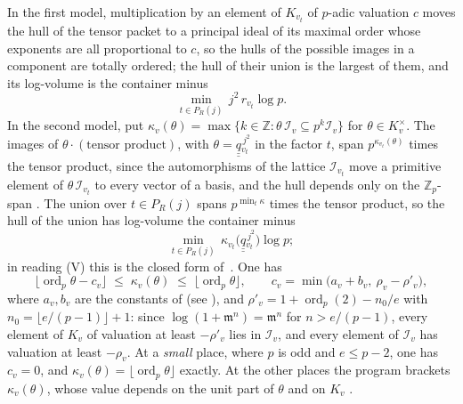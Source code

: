 \documentclass[11pt,a4paper]{article}
\newcommand{\qq}{\underline{\underline{q}}{}}
\newcommand{\Z}{\mathbb{Z}}
\newcommand{\cI}{\mathcal{I}}
\newcommand{\ord}{\operatorname{ord}}
\begin{document}
In the first model, multiplication by an element of $K_{v_t}$ of $p$-adic valuation $c$ moves the hull of the
tensor packet to a principal ideal of its maximal order whose exponents are all proportional to $c$, so the hulls
of the possible images in a component are totally ordered; the hull of their union is the largest of them, and its
log-volume is the container minus
\[
\min_{t\in P_R(j)}\,j^2\,r_{v_t}\log p .
\]
In the second model, put $\kappa_v(\theta)=\max\{k\in\Z:\theta\,\cI_v\subseteq p^k\cI_v\}$ for
$\theta\in K_v^\times$. The images of $\theta\cdot(\text{tensor product})$, with $\theta=\qq_{v_t}^{\,j^2}$ in the
factor $t$, span $p^{\kappa_{v_t}(\theta)}$ times the tensor product, since the automorphisms of the lattice
$\cI_{v_t}$ move a primitive element of $\theta\,\cI_{v_t}$ to every vector of a basis, and the hull depends only on
the $\Z_p$-span \cite[Lemmas~4.1--4.3]{Gap}. The union over $t\in P_R(j)$ spans $p^{\min_t\kappa}$ times the tensor
product, so the hull of the union has log-volume the container minus
\[
\min_{t\in P_R(j)}\,\kappa_{v_t}\bigl(\qq_{v_t}^{\,j^2}\bigr)\log p ;
\]
in reading (V) this is the closed form of~\cite[Thm.~3.2]{Gap}. One has
\[
\lfloor\ord_p\theta-c_v\rfloor\;\le\;\kappa_v(\theta)\;\le\;\lfloor\ord_p\theta\rfloor,\qquad
c_v=\min\bigl(a_v+b_v,\ \rho_v-\rho'_v\bigr),
\]
where $a_v,b_v$ are the constants of \cite[Prop.~1.2(i)]{IUT4} (see \cite[Thm.~3.3]{Gap}), and
$\rho'_v=1+\ord_p(2)-n_0/e$ with $n_0=\lfloor e/(p-1)\rfloor+1$: since $\log(1+\mathfrak{m}^n)=\mathfrak{m}^n$ for
$n>e/(p-1)$, every element of $K_v$ of valuation at least $-\rho'_v$ lies in $\cI_v$, and every element of $\cI_v$
has valuation at least $-\rho_v$. At a \emph{small} place, where $p$ is odd and $e\le p-2$, one has $c_v=0$, and
$\kappa_v(\theta)=\lfloor\ord_p\theta\rfloor$ exactly. At the other places the program brackets $\kappa_v(\theta)$,
whose value depends on the unit part of $\theta$ and on $K_v$ \cite[Ex.~5.2]{Gap}.
\end{document}
